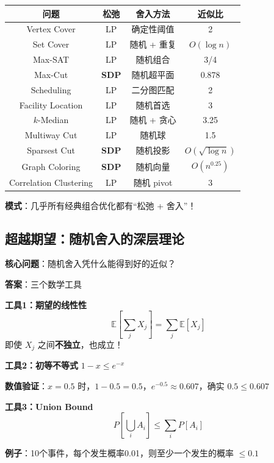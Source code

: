 \documentclass[12pt, a4paper]{ctexart}
\begin{document}
\begin{blackboard}[连续化近似算法大全]

\begin{center}
\begin{tabular}{c|c|c|c}
\textbf{问题} & \textbf{松弛} & \textbf{舍入方法} & \textbf{近似比} \\
\hline
Vertex Cover & LP & 确定性阈值 & 2 \\
Set Cover & LP & 随机 + 重复 & $O(\log n)$ \\
Max-SAT & LP & 随机组合 & 3/4 \\
Max-Cut & \textbf{SDP} & 随机超平面 & 0.878 \\
Scheduling & LP & 二分图匹配 & 2 \\
Facility Location & LP & 随机首选 & 3 \\
\hline
$k$-Median & LP & 随机 + 贪心 & 3.25 \\
Multiway Cut & LP & 随机球 & 1.5 \\
Sparsest Cut & \textbf{SDP} & 随机投影 & $O(\sqrt{\log n})$ \\
Graph Coloring & \textbf{SDP} & 随机向量 & $O(n^{0.25})$ \\
Correlation Clustering & LP & 随机 pivot & 3
\end{tabular}
\end{center}

\textbf{模式}：几乎所有经典组合优化都有``松弛 + 舍入''！

\end{blackboard}


\subsection{超越期望：随机舍入的深层理论}

\begin{blackboard}[随机化为何能超越简单松弛？]

\textbf{核心问题}：随机舍入凭什么能得到好的近似？

\textbf{答案}：三个数学工具

\textbf{工具1：期望的线性性}
\[
\mathbb{E}\left[\sum_j X_j\right] = \sum_j \mathbb{E}[X_j]
\]
即使 $X_j$ 之间\textbf{不独立}，也成立！

\textbf{工具2：初等不等式} $1 - x \leq e^{-x}$

\textbf{数值验证}：$x = 0.5$ 时，$1 - 0.5 = 0.5$，$e^{-0.5} \approx 0.607$，确实 $0.5 \leq 0.607$ \checkmark

\textbf{工具3：Union Bound}
\[
P\left[\bigcup_i A_i\right] \leq \sum_i P[A_i]
\]

\textbf{例子}：10个事件，每个发生概率0.01，则至少一个发生的概率 $\leq 0.1$

\end{blackboard}
\end{document}
